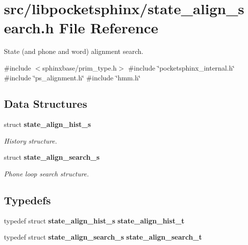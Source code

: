 \section{src/libpocketsphinx/state\+\_\+align\+\_\+search.h File Reference}
\label{state__align__search_8h}


State (and phone and word) alignment search.  


{\ttfamily \#include $<$sphinxbase/prim\+\_\+type.\+h$>$}\newline
{\ttfamily \#include \char`\"{}pocketsphinx\+\_\+internal.\+h\char`\"{}}\newline
{\ttfamily \#include \char`\"{}ps\+\_\+alignment.\+h\char`\"{}}\newline
{\ttfamily \#include \char`\"{}hmm.\+h\char`\"{}}\newline
\subsection*{Data Structures}
\begin{DoxyCompactItemize}
\item 
struct \textbf{ state\+\_\+align\+\_\+hist\+\_\+s}
\begin{DoxyCompactList}\small\item\em History structure. \end{DoxyCompactList}\item 
struct \textbf{ state\+\_\+align\+\_\+search\+\_\+s}
\begin{DoxyCompactList}\small\item\em Phone loop search structure. \end{DoxyCompactList}\end{DoxyCompactItemize}
\subsection*{Typedefs}
\begin{DoxyCompactItemize}
\item 
\mbox{\label{state__align__search_8h_a177ee88fd0b1e9f99bfa7cf7f9f256da}} 
typedef struct \textbf{ state\+\_\+align\+\_\+hist\+\_\+s} {\bfseries state\+\_\+align\+\_\+hist\+\_\+t}
\item 
\mbox{\label{state__align__search_8h_a4559ae74ee038260ff66f432a7205aa8}} 
typedef struct \textbf{ state\+\_\+align\+\_\+search\+\_\+s} {\bfseries state\+\_\+align\+\_\+search\+\_\+t}
\end{DoxyCompactItemize}
